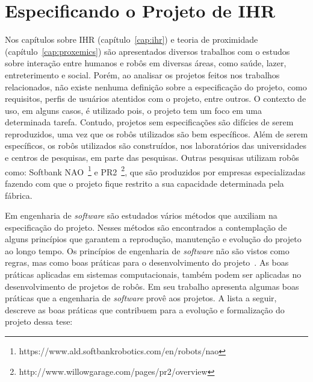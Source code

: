 \section{Especificando o Projeto de IHR}
\label{sec:projetoihr}
Nos capítulos sobre IHR (capítulo~\ref{cap:ihr}) e teoria de proximidade (capítulo~\ref{cap:proxemics}) são apresentados diversos trabalhos com o estudos sobre interação entre humanos e robôs em diversas áreas, como saúde, lazer, entreterimento e social. Porém, ao analisar os projetos feitos nos trabalhos relacionados, não existe nenhuma definição sobre a especificação do projeto, como requisitos, perfis de usuários atentidos com o projeto, entre outros. O contexto de uso, em alguns casos, é utilizado pois, o projeto tem um foco em uma determinada tarefa. Contudo, projetos sem especificações são difícies de serem reproduzidos, uma vez que os robôs utilizados são bem específicos. Além de serem específicos, os robôs utilizados são construídos, nos laboratórios das universidades e centros de pesquisas, em parte das pesquisas. Outras pesquisas utilizam robôs como: Softbank NAO~\footnote{https://www.ald.softbankrobotics.com/en/robots/nao} e PR2~\footnote{http://www.willowgarage.com/pages/pr2/overview}, que são produzidos por empresas especializadas fazendo com que o projeto fique restrito a sua capacidade determinada pela fábrica.

Em engenharia de \emph{software} são estudados vários métodos que auxiliam na especificação do projeto. Nesses métodos são encontrados a contemplação de alguns princípios que garantem a reprodução, manutenção e evolução do projeto ao longo tempo. Os princípios de engenharia de \emph{software} não são vistos como regras, mas como boas práticas para o desenvolvimento do projeto~\cite{wazlawick:2013}. As boas práticas aplicadas em sistemas computacionais, também podem ser aplicadas no desenvolvimento de projetos de robôs. Em seu trabalho \textcite{wazlawick:2013} apresenta algumas boas práticas que a engenharia de \emph{software} provê aos projetos. A lista a seguir, descreve as boas práticas que contribuem para a evolução e formalização do projeto dessa tese:


